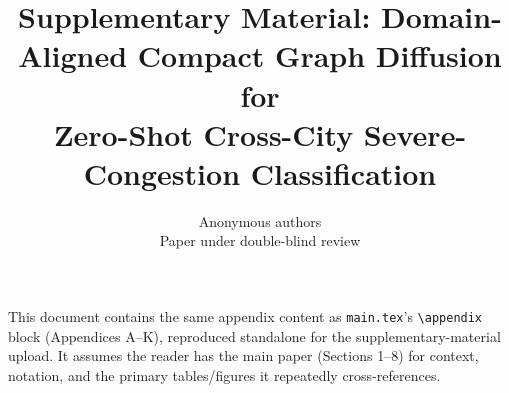 \documentclass{article}
\title{Supplementary Material: Domain-Aligned Compact Graph Diffusion for \\
Zero-Shot Cross-City Severe-Congestion Classification}
\author{Anonymous authors \\ Paper under double-blind review}
\date{}
\newif\ifhasrealstyle
\begin{document}
\maketitle
\ifhasrealstyle\else\PLACEHOLDERBANNER\fi

\noindent This document contains the same appendix content as \texttt{main.tex}'s
\texttt{\textbackslash appendix} block (Appendices A--K), reproduced standalone for the
supplementary-material upload. It assumes the reader has the main paper (Sections 1--8) for
context, notation, and the primary tables/figures it repeatedly cross-references.

\appendix



\end{document}

